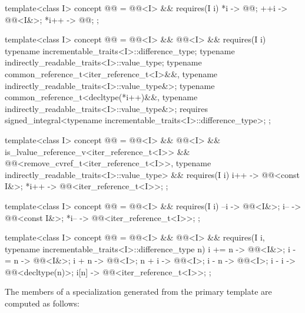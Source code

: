 \begin{codeblock}
template<class I>
concept @@ =
  @@<I> && requires(I i) {
    {   *i } -> @@;
    {  ++i } -> @@<I&>;
    { *i++ } -> @@;
  };

template<class I>
concept @@ =
  @@<I> && @@<I> && requires(I i) {
    typename incrementable_traits<I>::difference_type;
    typename indirectly_readable_traits<I>::value_type;
    typename common_reference_t<iter_reference_t<I>&&,
                                typename indirectly_readable_traits<I>::value_type&>;
    typename common_reference_t<decltype(*i++)&&,
                                typename indirectly_readable_traits<I>::value_type&>;
    requires signed_integral<typename incrementable_traits<I>::difference_type>;
  };

template<class I>
concept @@ =
  @@<I> && @@<I> &&
  is_lvalue_reference_v<iter_reference_t<I>> &&
  @@<remove_cvref_t<iter_reference_t<I>>,
          typename indirectly_readable_traits<I>::value_type> &&
  requires(I i) {
    {  i++ } -> @@<const I&>;
    { *i++ } -> @@<iter_reference_t<I>>;
  };

template<class I>
concept @@ =
  @@<I> && requires(I i) {
    {  --i } -> @@<I&>;
    {  i-- } -> @@<const I&>;
    { *i-- } -> @@<iter_reference_t<I>>;
  };

template<class I>
concept @@ =
  @@<I> && @@<I> &&
  requires(I i, typename incrementable_traits<I>::difference_type n) {
    { i += n } -> @@<I&>;
    { i -= n } -> @@<I&>;
    { i +  n } -> @@<I>;
    { n +  i } -> @@<I>;
    { i -  n } -> @@<I>;
    { i -  i } -> @@<decltype(n)>;
    {  i[n]  } -> @@<iter_reference_t<I>>;
  };
\end{codeblock}

\pnum
The members of a specialization  generated from the
 primary template are computed as follows:

